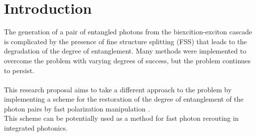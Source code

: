 \section{Introduction}
The generation of a pair of entangled photons from the biexcition-exciton cascade is complicated by the presence of fine structure splitting (FSS)\cite{Winik2017} that leads to the degradation of the degree of entanglement. Many methods were implemented to overcome the problem with varying degrees of success, but the problem continues to persist.  \\ \\
This research proposal aims to take a different approach to the problem by implementing a scheme for the restoration of the degree of entanglement of the photon pairs by fast polarization manipulation \cite{Fognini18,Varo2022}.\\
This scheme can be potentially used as a method for fast photon rerouting in integrated photonics.   

	
  	

